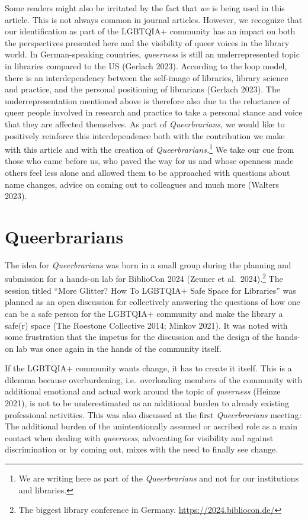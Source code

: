 \documentclass[a4paper,
fontsize=11pt,
oneside,
numbers=noperiodatend,
parskip=half-,
bibliography=totoc,
final
]{scrartcl}
\begin{document}
Some readers might also be irritated by the fact that \emph{we} is being
used in this article. This is not always common in journal articles.
However, we recognize that our identification as part of the LGBTQIA+
community has an impact on both the perspectives presented here and the
visibility of queer voices in the library world. In German-speaking
countries, \emph{queerness} is still an underrepresented topic in
libraries compared to the US (Gerlach 2023). According to the loop
model, there is an interdependency between the self-image of libraries,
library science and practice, and the personal positioning of librarians
(Gerlach 2023). The underrepresentation mentioned above is therefore
also due to the reluctance of queer people involved in research and
practice to take a personal stance and voice that they are affected
themselves. As part of \emph{Queerbrarians,} we would like to positively
reinforce this interdependence both with the contribution we make with
this article and with the creation of \emph{Queerbrarians.}\footnote{We
  are writing here as part of the \emph{Queerbrarians} and not for our
  institutions and libraries.} We take our cue from those who came
before us, who paved the way for us and whose openness made others feel
less alone and allowed them to be approached with questions about name
changes, advice on coming out to colleagues and much more (Walters
2023).

\hypertarget{queerbrarians}{%
\section{Queerbrarians}\label{queerbrarians}}

The idea for \emph{Queerbrarians} was born in a small group during the
planning and submission for a hands-on lab for BiblioCon 2024 (Zeuner
et al.~2024).\footnote{The biggest library conference in Germany.
  \url{https://2024.bibliocon.de/}} The session titled \enquote{More Glitter?
How To LGBTQIA+ Safe Space for Libraries} was planned as an open
discussion for collectively answering the questions of how one can be a
safe person for the LGBTQIA+ community and make the library a safe(r)
space (The Roestone Collective 2014; Minkov 2021). It was noted with
some frustration that the impetus for the discussion and the design of
the hands-on lab was once again in the hands of the community itself.

If the LGBTQIA+ community wants change, it has to create it itself. This
is a dilemma because overburdening, i.e.~overloading members of the
community with additional emotional and actual work around the topic of
\emph{queerness} (Heinze 2021), is not to be underestimated as an
additional burden to already existing professional activities. This was
also discussed at the first \emph{Queerbrarians} meeting\emph{:} The
additional burden of the unintentionally assumed or ascribed role as a
main contact when dealing with \emph{queerness}, advocating for
visibility and against discrimination or by coming out, mixes with the
need to finally see change.
\end{document}
